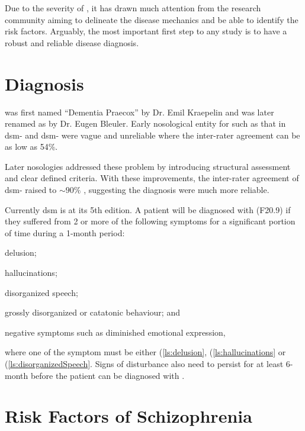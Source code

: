 \documentclass{book}
\newcommand{\rom}[1]{\uppercase\expandafter{\romannumeral #1\relax}}
\newcommand*{\glng}{\glsentrylong}
\newcommand*{\Glng}{\Glsentrylong}
\begin{document}
	Due to the severity of \glng{scz}, it has drawn much attention from the research community aiming to delineate the disease mechanics and be able to identify the risk factors.
	Arguably, the most important first step to any \glng{scz} study is to have a robust and reliable disease diagnosis.
	
	\section{Diagnosis}
	\Glng{scz} was first named ``Dementia Praecox'' by Dr. Emil Kraepelin and was later renamed as \glng{scz} by Dr. Eugen Bleuler\citep{Jablensky2010}.
	Early nosological entity for \glng{scz} such as that in \gls{dsm}-\rom{1} and \gls{dsm}-\rom{2} were vague and unreliable where the inter-rater agreement can be as low as 54$\%$.\citep{Tsuang2000,Harvey2012} 
	
	Later nosologies addressed these problem by introducing structural assessment and clear defined criteria. 
	With these improvements, the inter-rater agreement of \gls{dsm}-\rom{3} raised to $\sim 90\%$ \citep{Harvey2012}, suggesting the diagnosis were much more reliable.
	
	Currently \gls{dsm} is at its 5th edition\citep{AmericanPsychiatricAssociation2013}. 
	A patient will be diagnosed with \glng{scz}(F20.9) if they suffered from 2 or more of the following symptoms for a significant portion of time during a 1-month period: 
	\begin{enumerate*}[label=\arabic*\upshape)]
		\item delusion; \label{ls:delusion}
		\item hallucinations;\label{ls:hallucinations}
		\item disorganized speech;\label{ls:disorganizedSpeech}
		\item grossly disorganized or catatonic behaviour; and\label{ls:catatonicBehavior}
		\item negative symptoms such as diminished emotional expression,\label{ls:negativeSymptoms}
	\end{enumerate*}  where one of the symptom must be either (\ref{ls:delusion}, (\ref{ls:hallucinations} or (\ref{ls:disorganizedSpeech}.
	Signs of disturbance also need to persist for at least 6-month before the patient can be diagnosed with \glng{scz}.
	
	\section{Risk Factors of Schizophrenia}
	
\end{document}

